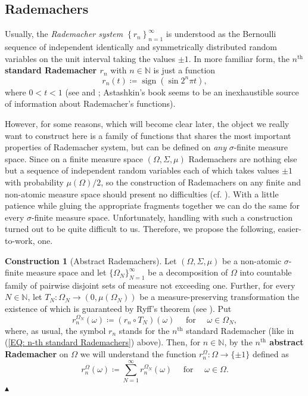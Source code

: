 \documentclass[11pt]{amsart}
\theoremstyle{definition}
\theoremstyle{definition}
\theoremstyle{definition}
\theoremstyle{definition}
\theoremstyle{definition}
\theoremstyle{definition}
\theoremstyle{definition}
\theoremstyle{definition}
\numberwithin{equation}{section}
\numberwithin{equation}{section}
\numberwithin{equation}{section}
\theoremstyle{definition}
\theoremstyle{definition}
\theoremstyle{definition}
\theoremstyle{definition}
\theoremstyle{definition}
\newtheorem{construction}[theorem]{Construction}
\theoremstyle{definition}
\DeclareMathOperator{\sign}{sign}
\newcommand\xqed[1]{%
	\leavevmode\unskip\penalty9999 \hbox{}\nobreak\hfill
	\quad\hbox{#1}}
\newcommand\demo{\xqed{{\Large $\blacktriangle$}}}
\begin{document}
\subsection{Rademachers} \label{SUBSEC: Rademachers}
Usually, the {\it Rademacher system $\left\{ r_n \right\}_{n=1}^{\infty}$} is understood as the Bernoulli sequence of independent identically
and symmetrically distributed random variables on the unit interval taking the values $\pm 1$. In more familiar form, the {\bf $n^{\text{th}}$ standard Rademacher $r_n$}
with $n \in \mathbb{N}$ is just a function
\begin{equation} \label{EQ: n-th standard Rademachers}
	r_n(t) \coloneqq \sign(\sin 2^n\pi t),
\end{equation}
where $0 < t < 1$ (see \cite[Definition~6.2.1, p.~132]{AK06} and \cite[p.~24]{LT77}; Astashkin's book \cite{Ast20} seems to be an
inexhaustible source of information about Rademacher's functions).

However, for some reasons, which will become clear later, the object we really want to construct here is a family of functions that shares
the most important properties of Rademacher system, but can be defined on {\it any} $\sigma$-finite measure space.
Since on a finite measure space $(\Omega,\Sigma,\mu)$ Rademachers are nothing else but a sequence of independent random variables
each of which takes values $\pm 1$ with probability $\mu(\Omega)/2$, so the construction of Rademachers on any finite and
non-atomic measure space should present no difficulties (cf. \cite[p.~224]{JL0506}). With a little patience while gluing the appropriate
fragments together we can do the same for every $\sigma$-finite measure space. Unfortunately, handling with such a construction turned out
to be quite difficult to us. Therefore, we propose the following, easier-to-work, one.

\begin{construction}[Abstract Rademachers] \label{DEF: Abstract Rademachers}
	Let $(\Omega,\Sigma,\mu)$ be a non-atomic $\sigma$-finite measure space and let $\{\Omega_{N}\}_{N=1}^{\infty}$
	be a decomposition of $\Omega$ into countable family of pairwise disjoint sets of measure not exceeding one. Further,
	for every $N \in \mathbb{N}$, let $T_{N} \colon \Omega_{N} \rightarrow (0,\mu(\Omega_N))$ be a measure-preserving transformation
	the existence of which is guaranteed by Ryff's theorem (see \cite[Theorem~7.5, p.~82]{BS88}). Put
	\begin{equation*}
		r^{\Omega_{N}}_n(\omega) \coloneqq (r_n \circ T_{N})(\omega) \quad \text{ for } \quad \omega \in \Omega_N,
	\end{equation*}
	where, as usual, the symbol $r_n$ stands for the $n^{\text{th}}$ standard Rademacher (like in (\ref{EQ: n-th standard Rademachers}) above).
	Then, for $n \in \mathbb{N}$, by the {\bf $n^{\text{th}}$ abstract Rademacher} on $\Omega$ we will understand the function
	$r^{\Omega}_n \colon \Omega \rightarrow \{\pm 1\}$ defined as
	\begin{equation*}
		r^{\Omega}_n(\omega) \coloneqq \sum_{N=1}^{\infty} r^{\Omega_{N}}_n(\omega) \quad \text{ for } \quad \omega \in \Omega.
	\end{equation*}
	\demo
\end{construction}
\end{document}
